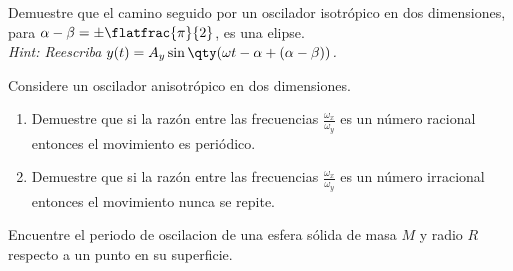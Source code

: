 \begin{mdframed}[style=warning]
	\begin{ejercicio}
		Demuestre que el camino seguido por un oscilador isotrópico en dos dimensiones, para $\alpha - \beta = \pm \flatfrac{\pi}{2}$, es una elipse.\\
		\textit{Hint: Reescriba $y(t) = A_y \sin{\qty(\omega t - \alpha + (\alpha - \beta))}$.}
	\end{ejercicio}
\end{mdframed}



\begin{mdframed}[style=warning]
	\begin{ejercicio}
		Considere un oscilador anisotrópico en dos dimensiones.
		\begin{enumerate}
			\item Demuestre que si la razón entre las frecuencias $\frac{\omega _x}{\omega _y}$ es un número racional entonces el movimiento es periódico.
			\item Demuestre que si la razón entre las frecuencias $\frac{\omega _x}{\omega _y}$ es un número irracional entonces el movimiento nunca se repite.
		\end{enumerate}
	\end{ejercicio}
\end{mdframed}



\begin{mdframed}[style=warning]
	\begin{ejercicio}
		Encuentre el periodo de oscilacion de una esfera sólida de masa $M$ y radio $R$ respecto a un punto en su superficie.
	\end{ejercicio}
\end{mdframed}



